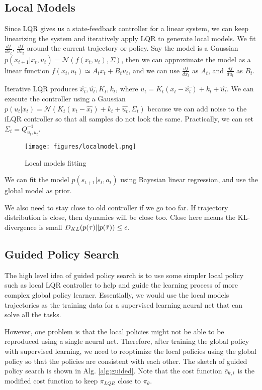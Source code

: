 \subsection{Local Models}
Since LQR gives us a state-feedback controller for a linear system, we can keep linearizing the system and iteratively apply LQR to generate local models. We fit $\frac{df}{d{x_t}}$, $\frac{df}{du_t}$ around the current trajectory or policy. Say the model is a Gaussian $p(x_{t+1}|x_t,u_t)=\mathcal{N}(f(x_t,u_t),\Sigma)$, then we can approximate the model as a linear function $f(x_t,u_t)\simeq A_t x_t+B_tu_t$, and we can use $\frac{df}{d{x_t}}$ as $A_t$, and $\frac{df}{du_t}$ as $B_t$.

Iterative LQR produces $\hat{x_t},\hat{u_t},K_t,k_t$, where $u_t = K_t(x_t-\hat{x_t})+k_t+\hat{u_t}$. We can execute the controller using a Gaussian $p(u_t|x_t) = \mathcal{N}(K_t(x_t-\hat{x_t})+k_t+\hat{u_t},\Sigma_t)$ because we can add noise to the iLQR controller so that all samples do not look the same. Practically, we can set $\Sigma_t = Q^{-1}_{u_t,u_t}$.
\begin{figure}
    \centering
    \texttt{[image: figures/localmodel.png]}
    \caption{Local models fitting}
    \label{fig:localmodel}
\end{figure}
We can fit the model $p(s_{t+1}|s_t,a_t)$ using Bayesian linear regression, and use the global model as prior.

We also need to stay close to old controller if we go too far. If trajectory distribution is close, then dynamics will be close too. Close here means the KL-divergence is small $D_{KL}(p(\tau)||p(\Bar{\tau}))\leq \epsilon$.


\subsection{Guided Policy Search}
The high level idea of guided policy search is to use some simpler local policy such as local LQR controller to help and guide the learning process of more complex global policy learner. Essentially, we would use the local models trajectories as the training data for a supervised learning neural net that can solve all the tasks.

However, one problem is that the local policies might not be able to be reproduced using a single neural net. Therefore, after training the global policy with supervised learning, we need to reoptimize the local policies using the global policy so that the policies are consistent with each other. The sketch of guided policy search is shown in Alg. \ref{alg:guided}. Note that the cost function $\Tilde{c}_{k,i}$ is the modified cost function to keep $\pi_{LQR}$ close to $\pi_\theta$.


